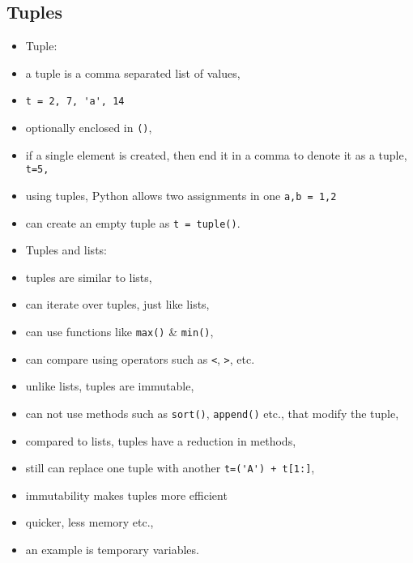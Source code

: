 \documentclass[onecolumn]{IEEEtran} %
\begin{document}
\subsection{Tuples\label{tuples_sec}}
\begin{itemize}
    \item Tuple:
    \bi
        \item a tuple is a comma separated list of values,
        \bi
            \item \verb|t = 2, 7, 'a', 14|
            \item optionally enclosed in \verb|()|,
            \item if a single element is created, then end it in a com\-ma to denote it as a tuple, \newline \verb|t=5,|
            \item using tuples, Python allows two assignments in one \newline \verb|a,b = 1,2|
        \ei
        \item can create an empty tuple as \verb|t = tuple()|.
    \ei
    \item Tuples and lists:
    \bi
        \item tuples are similar to lists,
        \bi
            \item can iterate over tuples, just like lists,
            \item can use functions like \verb|max()| \& \verb|min()|,
            \item can compare using operators such as \verb|<|, \verb|>|, etc.
        \ei
        \item unlike lists, tuples are immutable,
        \bi
            \item can not use methods such as \verb|sort()|, \verb|append()| etc., that modify the tuple,
            \item compared to lists, tuples have a reduction in methods,
            \item still can replace one tuple with another \newline \verb|t=('A') + t[1:]|,
            \item immutability makes tuples more efficient
            \bi
                \item quicker, less memory etc.,
                \item an example is temporary variables.
            \ei
        \ei
    \ei
\end{itemize}
\end{document}
